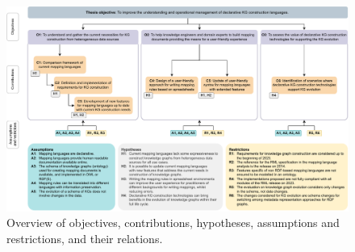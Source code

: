 \begin{figure}
    \centering
    \includegraphics[width=1\linewidth]{figures/chp3_summary.pdf}
    \caption[Relations between objectives, contributions, hypotheses, assumptions and restrictions of this thesis]{Overview of objectives, contributions, hypotheses, assumptions and restrictions, and their relations.}
    \label{fig:chp3_summary}
\end{figure}


